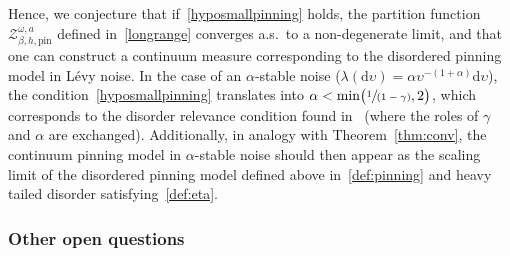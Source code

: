 \documentclass[10pt]{amsart}
\let\mathcal\mathscr
\newcommand{\spfrac}[2]{\sfrac{#1}{(#2)}}
\theoremstyle{definition}
\newcommand{\dd}{\mathrm{d}}
\newcommand{\cZ}{{\ensuremath{\mathcal Z}} }
\let\ga\alpha
\let\gb\beta
\let\ups\upsilon
\let\go\omega
\begin{document}
Hence, we conjecture that if~\eqref{hyposmallpinning} holds, the partition function~$\cZ_{\gb,h,\mathrm{pin}}^{\go,a}$ defined in~\eqref{longrange} converges a.s.\ to a non-degenerate limit, and that one can construct a continuum measure corresponding to the disordered pinning model in Lévy noise.
In the case of an $\ga$-stable noise (\ie $\lambda(\dd \ups) = \ga \ups^{-(1+\ga)} \dd \ups$),
the condition~\eqref{hyposmallpinning} translates into $\ga < \min \bigl(\spfrac{1}{1-\gamma}, 2 \bigr)$,
which corresponds to the disorder relevance condition found in~\cite{LS17} (where the roles of $\gamma$ and $\alpha$ are exchanged).
Additionally, in analogy with Theorem~\ref{thm:conv}, the continuum pinning model in $\ga$-stable noise should then appear
as the scaling limit of the disordered pinning model defined
above in~\eqref{def:pinning}
and heavy tailed disorder satisfying~\eqref{def:eta}.

\subsubsection{Other open questions}
\end{document}
